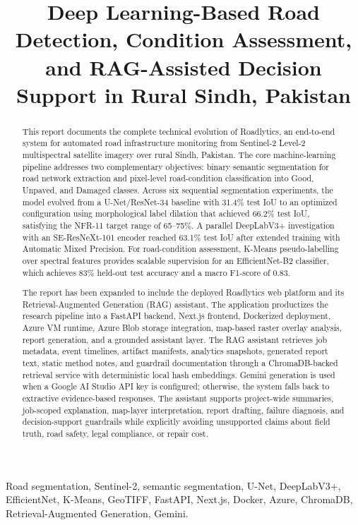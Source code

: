 ﻿\documentclass[conference]{IEEEtran}
\title{Deep Learning-Based Road Detection, Condition Assessment, and RAG-Assisted Decision Support in Rural Sindh, Pakistan}
\author{\IEEEauthorblockN{Hammadullah Muazzam}
\IEEEauthorblockA{Final Year Project Technical Report\\
Roadlytics: Road Intelligence Studio\\
April 2026}}
\begin{document}
\maketitle

\begin{abstract}
This report documents the complete technical evolution of Roadlytics, an end-to-end system for automated road infrastructure monitoring from Sentinel-2 Level-2 multispectral satellite imagery over rural Sindh, Pakistan. The core machine-learning pipeline addresses two complementary objectives: binary semantic segmentation for road network extraction and pixel-level road-condition classification into Good, Unpaved, and Damaged classes. Across six sequential segmentation experiments, the model evolved from a U-Net/ResNet-34 baseline with 31.4\% test IoU to an optimized configuration using morphological label dilation that achieved 66.2\% test IoU, satisfying the NFR-11 target range of 65--75\%. A parallel DeepLabV3+ investigation with an SE-ResNeXt-101 encoder reached 63.1\% test IoU after extended training with Automatic Mixed Precision. For road-condition assessment, K-Means pseudo-labelling over spectral features provides scalable supervision for an EfficientNet-B2 classifier, which achieves 83\% held-out test accuracy and a macro F1-score of 0.83.

The report has been expanded to include the deployed Roadlytics web platform and its Retrieval-Augmented Generation (RAG) assistant. The application productizes the research pipeline into a FastAPI backend, Next.js frontend, Dockerized deployment, Azure VM runtime, Azure Blob storage integration, map-based raster overlay analysis, report generation, and a grounded assistant layer. The RAG assistant retrieves job metadata, event timelines, artifact manifests, analytics snapshots, generated report text, static method notes, and guardrail documentation through a ChromaDB-backed retrieval service with deterministic local hash embeddings. Gemini generation is used when a Google AI Studio API key is configured; otherwise, the system falls back to extractive evidence-based responses. The assistant supports project-wide summaries, job-scoped explanation, map-layer interpretation, report drafting, failure diagnosis, and decision-support guardrails while explicitly avoiding unsupported claims about field truth, road safety, legal compliance, or repair cost.
\end{abstract}

\begin{IEEEkeywords}
Road segmentation, Sentinel-2, semantic segmentation, U-Net, DeepLabV3+, EfficientNet, K-Means, GeoTIFF, FastAPI, Next.js, Docker, Azure, ChromaDB, Retrieval-Augmented Generation, Gemini.
\end{IEEEkeywords}
\end{document}
